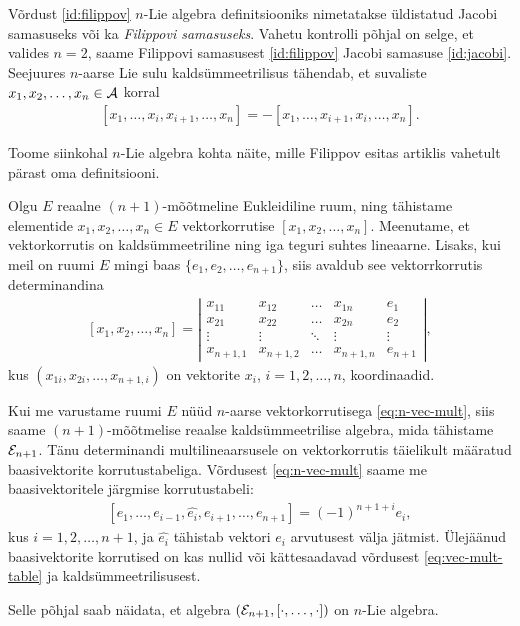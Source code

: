 Võrdust \eqref{id:filippov} $n$-Lie algebra definitsiooniks
nimetatakse üldistatud Jacobi samasuseks või ka
\emph{Filippovi samasuseks}. Vahetu kontrolli põhjal
on selge, et valides $n = 2$, saame Filippovi samasusest
\eqref{id:filippov} Jacobi samasuse \eqref{id:jacobi}. Seejuures
$n$-aarse Lie sulu kaldsümmeetrilisus tähendab, et
suvaliste $x_1, x_2, \dots, x_n \in \mathcal{A}$ korral
\begin{align}\label{def:n-lie-brac-antisymm}
    [x_1, \dots, x_i, x_{i+1}, \dots, x_n] =
    -[x_1, \dots, x_{i+1}, x_i, \dots, x_n].
\end{align}

Toome siinkohal $n$-Lie algebra kohta näite, mille
Filippov esitas artiklis \cite{filippov1985} vahetult
pärast oma definitsiooni.

\begin{naide}
    Olgu $E$ reaalne $(n+1)$-mõõtmeline Eukleidiline ruum,
    ning tähistame elementide $x_1, x_2, \dots, x_n \in E$
    vektorkorrutise $[x_1, x_2, \dots, x_n]$. Meenutame, 
    et vektorkorrutis on kaldsümmeetriline ning iga teguri
    suhtes lineaarne. Lisaks, kui meil on ruumi $E$ mingi
    baas $\{e_1, e_2, \dots, e_{n+1}\}$, siis avaldub see
    vektorrkorrutis determinandina
    \begin{align}\label{eq:n-vec-mult}
        [x_1, x_2, \dots, x_n] = \left|\begin{matrix}
          x_{11}    & x_{12}    & \dots  & x_{1n}    & e_1    \\
          x_{21}    & x_{22}    & \dots  & x_{2n}    & e_2    \\
          \vdots    & \vdots    & \ddots & \vdots    & \vdots \\
          x_{n+1,1} & x_{n+1,2} & \dots  & x_{n+1,n} & e_{n+1}
        \end{matrix}\right|,
    \end{align}
    kus $(x_{1i}, x_{2i}, \dots, x_{n+1,i})$ on vektorite
    $x_i$, $i = 1, 2, \dots, n$, koordinaadid.

    Kui me varustame ruumi $E$ nüüd $n$-aarse vektorkorrutisega
    \eqref{eq:n-vec-mult}, siis saame $(n+1)$-mõõtmelise
    reaalse kaldsümmeetrilise algebra, mida tähistame
    $\mathcal{E}_{n+1}$. Tänu determinandi multilineaarsusele on
    vektorkorrutis täielikult määratud baasivektorite
    korrutustabeliga. Võrdusest \eqref{eq:n-vec-mult} saame
    me baasivektoritele järgmise korrutustabeli:
    \begin{align}\label{eq:vec-mult-table}
        [e_1, \dots, e_{i-1}, \hat{e_i}, e_{i+1}, \dots, e_{n+1}]
        = (-1)^{n+1+i} e_i,
    \end{align}
    kus $i = 1, 2, \dots, n+1$, ja $\hat{e_i}$ tähistab
    vektori $e_i$ arvutusest välja jätmist. Ülejäänud
    baasivektorite korrutised on kas nullid või kättesaadavad
    võrdusest \eqref{eq:vec-mult-table} ja
    kaldsümmeetrilisusest.

    Selle põhjal saab näidata, et algebra
    $(\mathcal{E}_{n+1}, [\cdot, \dots, \cdot])$ on $n$-Lie
    algebra.\cite{filippov1985}
\end{naide}

